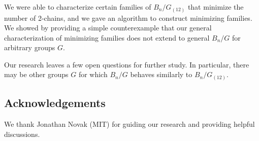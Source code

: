 \documentclass[12pt]{article}
\theoremstyle{plain}
\theoremstyle{definition}
\theoremstyle{remark}
\begin{document}
We were able to characterize certain families of $B_n / G_{(12)}$ that minimize the number of 2-chains, and we gave an algorithm to construct minimizing families. We showed by providing a simple counterexample that our general characterization of minimizing families does not extend to general $B_n / G$ for arbitrary groups $G$.

Our research leaves a few open questions for further study. In particular, there may be other groups $G$ for which $B_n / G$ behaves similarly to $B_n / G_{(12)}$. 

\subsection*{Acknowledgements}
We thank Jonathan Novak (MIT) for guiding our research and providing helpful discussions.

 
 


\end{document}

